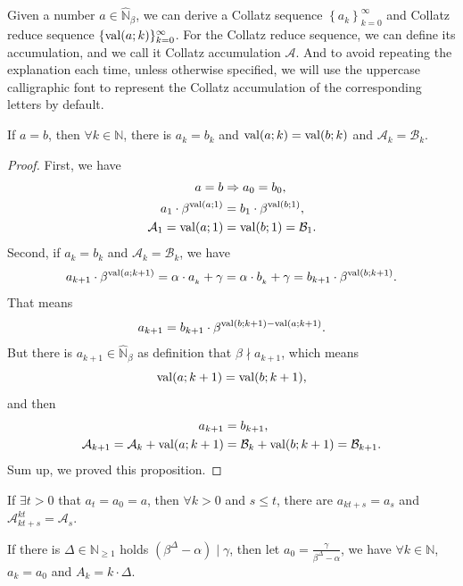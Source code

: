 Given a number $a \in \widehat{\mathbb{N}}_{{\beta}}$, we can derive a Collatz sequence $\left\{a_{k}\right\}_{k = 0}^{\infty}$ and Collatz reduce sequence $\{\operatorname{val}(a;k)\}_{k=0}^{\infty}$. For the Collatz reduce sequence, we can define its accumulation, and we call it Collatz accumulation $\mathcal{A}$.
And to avoid repeating the explanation each time, unless otherwise specified, we will use the uppercase calligraphic font to represent the Collatz accumulation of the corresponding letters by default.
\begin{proposition}[Uniqueness]\label{proposition:uniqueness}
If $a = b$, then $\forall k \in \mathbb{N}$, there is $a_k = b_k$ and $\operatorname{val}(a;k) = \operatorname{val}(b;k)$ and $\mathcal{A}_k = \mathcal{B}_k$.
\end{proposition}
\begin{proof}
    First, we have
    \begin{align*}
        a = b &\Rightarrow a_0 = b_0, \\
        a_1 \cdot \beta^{\operatorname{val}(a;1)} &= b_1 \cdot \beta^{\operatorname{val}(b;1)}, \\
        \mathcal{A}_1 = \operatorname{val}(a;1) &= \operatorname{val}(b;1) = \mathcal{B}_1.
    \end{align*}
    Second, if $a_k = b_k$ and $\mathcal{A}_k = \mathcal{B}_k$, we have
    \[a_{k+1} \cdot \beta^{\operatorname{val}(a;k + 1)} = \alpha\cdot a_{_k} + \gamma = \alpha\cdot b_{_k} + \gamma = b_{k+1} \cdot \beta^{\operatorname{val}(b;k + 1)}.\]
    That means
    \[a_{k+1} = b_{k+1} \cdot \beta^{\operatorname{val}(b;k + 1) - \operatorname{val}(a;k + 1)}. \]
    But there is $a_{k+1} \in \widehat{\mathbb{N}}_{{\beta}}$ as definition that $\beta \nmid a_{k+1}$, which means
    \[\operatorname{val}(a;k + 1) = \operatorname{val}(b;k + 1), \]
    and then
    \begin{align*}
        a_{k+1} &= b_{k+1}, \\
        \mathcal{A}_{k+1} = \mathcal{A}_{k} + \operatorname{val}(a;k+1) &= \mathcal{B}_{k} + \operatorname{val}(b;k+1) = \mathcal{B}_{k+1}.
    \end{align*}
    Sum up, we proved this proposition.
\end{proof}
\begin{proposition}
    If $\exists t > 0$ that $a_{t} = a_0 = a$, then $\forall k > 0$ and $s \le t$, there are
    $a_{kt+s} = a_s$ and $\mathcal{A}_{kt + s}^{kt} = \mathcal{A}_{s}$.
\end{proposition}
\begin{proposition}\label{proposition:trivial-periodic-sequence}
    If there is $\Delta \in \mathbb{N}_{\ge1}$ holds $(\beta^{\Delta} - \alpha) \mid \gamma$, then let $a_0 = \frac{\gamma}{\beta^{\Delta} - \alpha}$, we have $\forall k \in \mathbb{N}$, $a_k = a_0$ and $A_k = k\cdot \Delta$.
\end{proposition}
